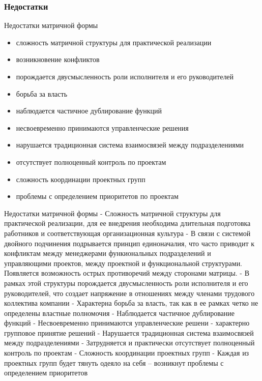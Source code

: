 \documentclass{industrial-development}
\begin{document}
\begin{frame} \frametitle{Недостатки}
  \begin{block}{Недостатки матричной формы}
  \end{block}
  
  \begin{itemize}
  \item сложность матричной структуры для практической реализации
  \item возникновение конфликтов
  \item порождается двусмысленность роли исполнителя и его руководителей
  \item борьба за власть
  \item наблюдается частичное дублирование функций
  \item несвоевременно принимаются управленческие решения
  \item нарушается традиционная система взаимосвязей между подразделениями
  \item отсутствует полноценный контроль по проектам
  \item сложность координации проектных групп
  \item проблемы  с определением приоритетов по проектам
  \end{itemize}
\end{frame}

\lecturenotes
Недостатки матричной формы
- Сложность матричной структуры для практической реализации, для ее внедрения необходима длительная подготовка работников и соответствующая организационная культура
- В связи с системой двойного подчинения подрывается принцип единоначалия, что часто приводит к конфликтам между менеджерами функиональных подразделений и управляющими проектов, между проектной и функциональной структурами. Появляется возможность острых противоречий между сторонами матрицы.
- В рамках этой структуры порождается двусмысленность роли исполнителя и его руководителей, что создает напряжение в отношениях между членами трудового коллектива компании
- Характерна борьба за власть, так как в ее рамках четко не определены властные полномочия
- Наблюдается частичное дублирование функций
- Несвоевременно принимаются управленческие решени - характерно групповое принятие решений
- Нарушается традиционная система взаимосвязей между подразделениями
- Затрудняется и практически отсутствует полноценный контроль по проектам
- Сложность координации проектных групп
- Каждая из проектных групп будет тянуть одеяло на себя – возникнут проблемы  с определением приоритетов
\end{document}
